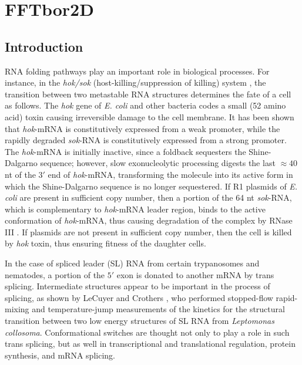 
\newcommand{\p}{{\bf p}}

\chapter{FFTbor2D} %

\label{FFTbor2D} %


\section{Introduction}

RNA folding pathways play an important role in biological processes.
For instance, in the {\em hok/sok}
(host-killing/suppression of killing) system \cite{Gerdes.arg97},
the transition between two metastable RNA structures determines the
fate of a cell as follows.
The {\em hok} gene of {\em E. coli} and other bacteria
codes a small (52 amino acid) toxin causing irreversible damage to the cell
membrane. It has been shown that {\em hok}-mRNA is
constitutively expressed from a weak promoter, while
the rapidly degraded {\em sok}-RNA is constitutively expressed from
a strong promoter.  The {\em hok}-mRNA is initially
inactive, since a foldback sequesters the
Shine-Dalgarno sequence; however, slow exonucleolytic processing
digests the last $\approx 40$ nt of the $3'$ end of {\em hok}-mRNA,
transforming the molecule into its active form in which
the Shine-Dalgarno sequence is no longer sequestered.
If R1 plasmids of {\em E. coli} are present in
sufficient copy number, then a portion of the 64 nt
{\em sok}-RNA, which is complementary to {\em hok}-mRNA leader
region, binds to the active conformation of {\em hok}-mRNA, thus
causing degradation of the complex by RNase III \cite{Gerdes.arg97}.
If plasmids are not present in sufficient copy number, then the
cell is killed by {\em hok} toxin, thus ensuring fitness of the daughter
cells.

In the case of spliced leader (SL) RNA from certain trypanosomes and nematodes,
a portion of the $5'$ exon is donated to
another mRNA by trans splicing.
Intermediate structures appear to be important in the process of splicing,
as shown by LeCuyer and Crothers \cite{lecuyerCrothers}, who performed
stopped-flow rapid-mixing and temperature-jump measurements
of the kinetics for the structural transition between two low
energy structures of SL RNA from {\em Leptomonas collosoma}.
Conformational switches are thought not only to play a role in such
trans splicing, but as well in transcriptional and
translational regulation, protein synthesis, and mRNA splicing.


